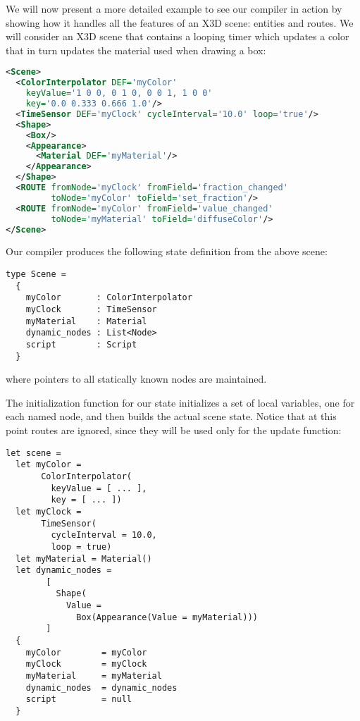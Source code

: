
We will now present a more detailed example to see our compiler in action by showing how it handles all the features of an X3D scene: entities and routes. We will consider an X3D scene that contains a looping timer which updates a color that in turn updates the material used when drawing a box:

\begin{lstlisting}[language=xml]
<Scene>
  <ColorInterpolator DEF='myColor'
    keyValue='1 0 0, 0 1 0, 0 0 1, 1 0 0'
    key='0.0 0.333 0.666 1.0'/>
  <TimeSensor DEF='myClock' cycleInterval='10.0' loop='true'/>
  <Shape>
    <Box/>
    <Appearance>
      <Material DEF='myMaterial'/>
    </Appearance>
  </Shape>
  <ROUTE fromNode='myClock' fromField='fraction_changed'
         toNode='myColor' toField='set_fraction'/>
  <ROUTE fromNode='myColor' fromField='value_changed'
         toNode='myMaterial' toField='diffuseColor'/>
</Scene>
\end{lstlisting}

Our compiler produces the following state definition from the above scene:

\begin{lstlisting}
type Scene =
  {
    myColor       : ColorInterpolator
    myClock       : TimeSensor
    myMaterial    : Material
    dynamic_nodes : List<Node>
    script        : Script
  }
\end{lstlisting}

where pointers to all statically known nodes are maintained.

The initialization function for our state initializes a set of local variables, one for each named node, and then builds the actual scene state. Notice that at this point routes are ignored, since they will be used only for the update function:

\begin{lstlisting}
let scene = 
  let myColor = 
       ColorInterpolator(
         keyValue = [ ... ],
         key = [ ... ])
  let myClock = 
       TimeSensor(
         cycleInterval = 10.0,
         loop = true)
  let myMaterial = Material()
  let dynamic_nodes = 
        [
          Shape(
            Value = 
              Box(Appearance(Value = myMaterial)))
        ]
  {
    myColor        = myColor
    myClock        = myClock
    myMaterial     = myMaterial
    dynamic_nodes  = dynamic_nodes
    script         = null
  }         
\end{lstlisting}


